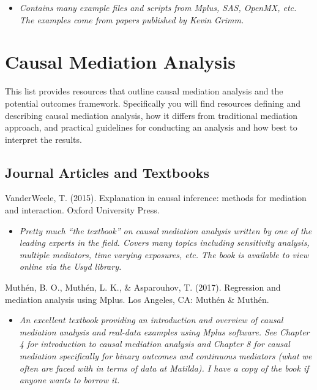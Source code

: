 \documentclass[
]{book}
\providecommand{\tightlist}{%
  \setlength{\itemsep}{0pt}\setlength{\parskip}{0pt}}
\begin{document}
\begin{itemize}
\tightlist
\item
  \emph{Contains many example files and scripts from Mplus, SAS, OpenMX, etc. The examples come from papers published by Kevin Grimm.}
\end{itemize}

\hypertarget{causal-mediation-analysis}{%
\chapter{Causal Mediation Analysis}\label{causal-mediation-analysis}}

This list provides resources that outline causal mediation analysis and the potential outcomes framework. Specifically you will find resources defining and describing causal mediation analysis, how it differs from traditional mediation approach, and practical guidelines for conducting an analysis and how best to interpret the results.

\hypertarget{journal-articles-and-textbooks-3}{%
\section{Journal Articles and Textbooks}\label{journal-articles-and-textbooks-3}}

VanderWeele, T. (2015). Explanation in causal inference: methods for mediation and interaction. Oxford University Press.

\begin{itemize}
\tightlist
\item
  \emph{Pretty much ``the textbook'' on causal mediation analysis written by one of the leading experts in the field. Covers many topics including sensitivity analysis, multiple mediators, time varying exposures, etc. The book is available to view online via the Usyd library. }
\end{itemize}

Muthén, B. O., Muthén, L. K., \& Asparouhov, T. (2017). Regression and mediation analysis using Mplus. Los Angeles, CA: Muthén \& Muthén.

\begin{itemize}
\tightlist
\item
  \emph{An excellent textbook providing an introduction and overview of causal mediation analysis and real-data examples using Mplus software. See Chapter 4 for introduction to causal mediation analysis and Chapter 8 for causal mediation specifically for binary outcomes and continuous mediators (what we often are faced with in terms of data at Matilda). I have a copy of the book if anyone wants to borrow it.}
\end{itemize}
\end{document}
